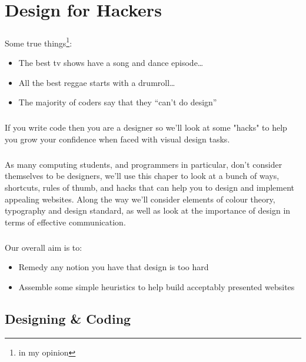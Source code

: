 \chapter{Design for Hackers}
\label{design}
\paragraph{} Some true things\footnote{in my opinion}:

\begin{itemize}
    \item The best tv shows have a song and dance episode…
    \item All the best reggae starts with a drumroll\dots 
    \item The majority of coders say that they “can’t do design”
\end{itemize}

\paragraph{} If you write code then you are a designer so we'll look at some "hacks" to help you grow your confidence when faced with visual design tasks.
\paragraph{} As many computing students, and programmers in particular, don't consider themselves to be designers, we'll use this chaper to look at a bunch of ways, shortcuts, rules of thumb, and hacks that can help you to design and implement appealing websites. Along the way we'll consider elements of colour theory, typography and design standard, as well as look at the importance of design in terms of effective communication.
\paragraph{} Our overall aim is to:

\begin{itemize}
    \item  Remedy any notion you have that design is too hard
    \item Assemble some simple heuristics to help build acceptably presented websites
\end{itemize}

\section{Designing \& Coding}
